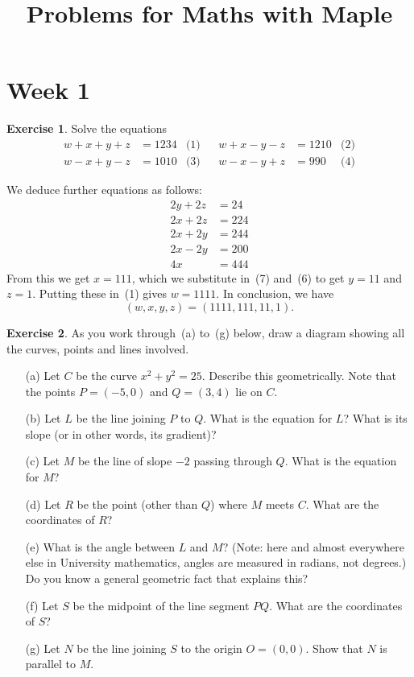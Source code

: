 \documentclass[a4paper]{amsart}
\title{Problems for Maths with Maple}
\theoremstyle{definition}
\newtheorem{exercise}{Exercise}[section]
\newenvironment{solution}{{\noindent \bf Solution:}}{}
\begin{document}
\maketitle

\section*{Week 1}
\addtocounter{section}{1}\setcounter{exercise}{0}

\begin{exercise}\label{ex-lin-misc-i}
Solve the equations
 \begin{align*}
  w+x+y+z &= 1234 & \text{(1)} & &
  w+x-y-z &= 1210 & \text{(2)} \\
  w-x+y-z &= 1010 & \text{(3)} & &
  w-x-y+z &=  990 & \text{(4)}
 \end{align*}
\end{exercise}
\begin{solution}
We deduce further equations as follows:
 \begin{align*}
  2y+2z &= 24  \tag{(5)=(1)-(2)} \\
  2x+2z &= 224 \tag{(6)=(1)-(3)} \\
  2x+2y &= 244 \tag{(7)=(1)-(4)} \\
  2x-2y &= 200 \tag{(8)=(6)-(5)} \\
  4x    &= 444 \tag{(9)=(7)+(8)}
 \end{align*}
 From this we get $x=111$, which we substitute in~(7) and~(6) to get
 $y=11$ and $z=1$.  Putting these in~(1) gives $w=1111$.  In
 conclusion, we have
 \[ (w,x,y,z) = (1111,111,11,1). \]
\end{solution}
\begin{exercise}\label{ex-circ-geom}
As you work through~(a) to~(g) below, draw a diagram showing all the
 curves, points and lines involved.
 \begin{itemize} 
  \item[(a)] Let $C$ be the curve $x^2+y^2=25$.  Describe this
   geometrically.  Note that the points $P=(-5,0)$ and $Q=(3,4)$ lie
   on $C$.
  \item[(b)] Let $L$ be the line joining $P$ to $Q$.  What is the
   equation for $L$?  What is its slope (or in other words, its gradient)? 
  \item[(c)] Let $M$ be the line of slope $-2$ passing through $Q$.
   What is the equation for $M$?  
  \item[(d)] Let $R$ be the point (other than $Q$) where $M$ meets
   $C$.  What are the coordinates of $R$?
  \item[(e)] What is the angle between $L$ and $M$?  (Note: here and almost
   everywhere else in University mathematics, angles are measured in
   radians, not degrees.)  Do you know a general geometric fact that
   explains this?   
  \item[(f)] Let $S$ be the midpoint of the line segment $PQ$.  What
   are the coordinates of $S$?
  \item[(g)] Let $N$ be the line joining $S$ to the origin $O=(0,0)$.
   Show that $N$ is parallel to $M$.
 \end{itemize}
\end{exercise}
\end{document}
